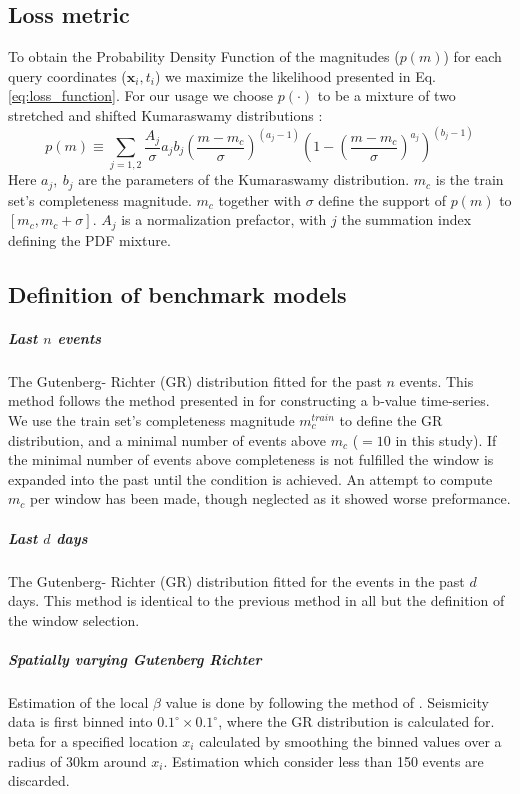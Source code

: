 \documentclass[pdflatex]{sn-jnl}
\begin{document}
\subsection{Loss metric}
To obtain the Probability Density Function of the magnitudes ($p(m)$) for each query coordinates ($\textbf{x}_i, t_i$) we maximize the likelihood presented in Eq. \ref{eq:loss_function}. For our usage we choose $p(\cdot)$ to be a mixture of two stretched and shifted Kumaraswamy distributions \cite{kumaraswamy_generalized_1980}:
\begin{equation}
    p\left( m \right)
    \equiv
    \sum_{j=1,2} \frac{A_j}{\sigma}a_jb_j\left(\frac{m-m_c}{\sigma}\right)^{\left(a_j-1\right)}\left(1-\left(\frac{m-m_c}{\sigma}\right)^{a_j}\right)^{\left(b_j-1\right)}
\end{equation}
Here $a_j, \ b_j$ are the parameters of the Kumaraswamy distribution. $m_c$ is the train set's completeness magnitude. $m_c$ together with $\sigma$ define the support of $p(m)$ to $[m_c, m_c+\sigma]$. $A_j$ is a normalization prefactor, with $j$ the summation index defining the PDF mixture.

\subsection{Definition of benchmark models}
\subparagraph{Last $n$ events} The Gutenberg- Richter (GR) distribution fitted for the past $n$ events. This method follows the method presented in \cite{gulia_real-time_2019} for constructing a b-value time-series. We use the train set's completeness magnitude $m_c^{train}$ to define the GR distribution, and a minimal number of events above $m_c$ ($=10$ in this study). If the minimal number of events above completeness is not fulfilled the window is expanded into the past until the condition is achieved. An attempt to compute $m_c$ per window has been made, though neglected as it showed worse preformance.

\subparagraph{Last $d$ days} The Gutenberg- Richter (GR) distribution fitted for the events in the past $d$ days. This method is identical to the previous method in all but the definition of the window selection.


\subparagraph{Spatially varying Gutenberg Richter} Estimation of the local $\beta$ value is done by following the method of \cite{taroni_highdefinition_2021}. Seismicity data is first binned into $0.1^\circ \times 0.1^\circ$, where the GR distribution is calculated for. beta for a specified location $x_i$ calculated by smoothing the binned values over a radius of 30km around $x_i$. Estimation which consider less than 150 events are discarded.
\end{document}
